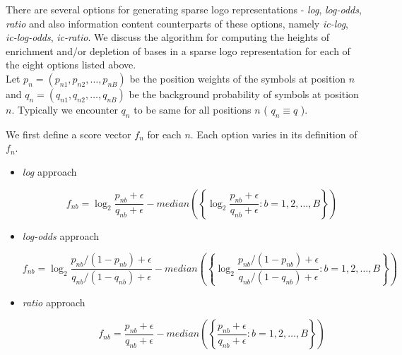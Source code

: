 \documentclass{bmcart}
\begin{document}
There are several options for generating sparse logo representations - \textit{log}, \textit{log-odds}, \textit{ratio} and also information content counterparts of these options, namely \textit{ic-log}, \textit{ic-log-odds}, \textit{ic-ratio}. We discuss the algorithm for computing the heights of enrichment and/or depletion of bases in a sparse logo representation for each of the eight options listed above.  \\[3 pt]

Let $p_{n} = \left( p_{n1}, p_{n2}, \ldots, p_{nB} \right)$ be the position weights of the symbols at position $n$  and $q_{n} =\left( q_{n1}, q_{n2}, \ldots, q_{nB} \right)$ be the background probability of symbols at position $n$. Typically we encounter $q_{n}$ to be same for all positions $n$ ( $ q_{n} \equiv q$ ). 

We first define a score vector $f_{n}$ for each $n$. Each option varies in its definition of $f_{n}$.

\begin{itemize}

\item \textit{log} approach

\begin{equation}\label{log_f}
\qquad f_{nb} = \log_2 \frac{p_{nb} + \epsilon}{q_{nb} + \epsilon} - median \left ( \left \{ \log_2 \frac{p_{nb} + \epsilon}{q_{nb} + \epsilon} : b = 1, 2, \ldots, B \right \} \right )
\end{equation}

\item \textit{log-odds} approach

\begin{equation}\label{log_odds_f}
f_{nb} = \log_2 \frac{p_{nb}/(1 - p_{nb}) + \epsilon}{q_{nb}/(1 - q_{nb}) + \epsilon} - median \left ( \left \{ \log_2 \frac{p_{nb}/(1 - p_{nb}) + \epsilon}{q_{nb}/(1 - q_{nb}) + \epsilon} : b = 1, 2, \ldots, B \right \} \right )
\end{equation}

\item \textit{ratio} approach

\begin{equation}\label{log_ratio_f}
\qquad \qquad f_{nb} =  \frac{p_{nb} + \epsilon}{q_{nb} + \epsilon} - median \left ( \left \{  \frac{p_{nb} + \epsilon}{q_{nb} + \epsilon} : b = 1, 2, \ldots, B \right \} \right )
\end{equation}



\end{itemize}
\end{document}
